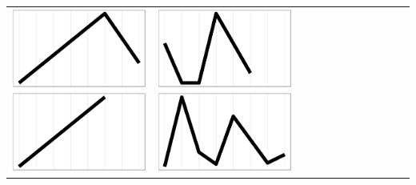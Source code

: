 \documentclass[conference]{worldcomp}
\begin{document}
\begin{table}
\begin{tabular}{ | b{1.5cm} | c | c | c | c | c | c | c | c | c | c | c |}
 \includegraphics[scale=0.08]{figures/babc.ps} &  
 \includegraphics[scale=0.08]{figures/bbba.ps} &  

\end{tabular}
\end{table}
\end{document}
